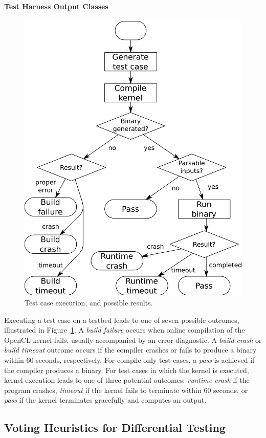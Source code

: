 \paragraph*{Test Harness Output Classes}
\begin{figure}
  \centering %
  \includegraphics[width=.7\columnwidth]{img/testprocess-long}
  \caption{%
  Test case execution, and possible results.%
  }%
  \label{fig:test-process}
\end{figure}
Executing a test case on a testbed leads to one of seven possible outcomes,
illustrated in Figure~\ref{fig:test-process}. A \emph{build failure} occurs when
online compilation of the OpenCL kernel fails, usually accompanied by an error
diagnostic. A \emph{build crash} or \emph{build timeout} outcome occurs if the
compiler crashes or fails to produce a binary within 60 seconds, respectively.
For compile-only test cases, a \emph{pass} is achieved if the compiler produces
a binary. For test cases in which the kernel is executed, kernel execution leads
to one of three potential outcomes: \emph{runtime crash} if the program crashes,
\emph{timeout} if the kernel fails to terminate within 60 seconds, or
\emph{pass} if the kernel terminates gracefully and computes an output.

\subsection{Voting Heuristics for Differential Testing}

